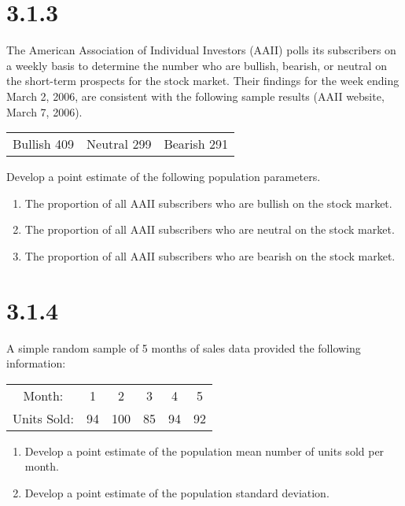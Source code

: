 \documentclass{article}
\begin{document}
\section*{3.1.3}
The American Association of Individual Investors (AAII) polls its subscribers on a weekly basis to determine the number who are bullish, bearish, or neutral on the short-term prospects for the stock market. Their findings for the week ending March 2, 2006, are consistent with the following sample results (AAII website, March 7, 2006).
\begin{table}[h!]
  \centering
  \begin{tabular}{c c c}
    Bullish 409 &Neutral 299 &Bearish 291\\
  \end{tabular}
\end{table}
Develop a point estimate of the following population parameters.
\begin{enumerate}
  \item The proportion of all AAII subscribers who are bullish on the stock market.
  \item The proportion of all AAII subscribers who are neutral on the stock market.
  \item The proportion of all AAII subscribers who are bearish on the stock market.
\end{enumerate}

\section*{3.1.4}
A simple random sample of 5 months of sales data provided the following information:
\begin{table}[h!]
  \centering
  \begin{tabular}{c c c c c c}
    Month: &1 &2 &3 &4 &5 \\
    Units Sold: &94 &100 &85 &94 &92\\
  \end{tabular}
\end{table}
\begin{enumerate}
  \item Develop a point estimate of the population mean number of units sold per month.
  \item Develop a point estimate of the population standard deviation.
\end{enumerate}
\end{document}
